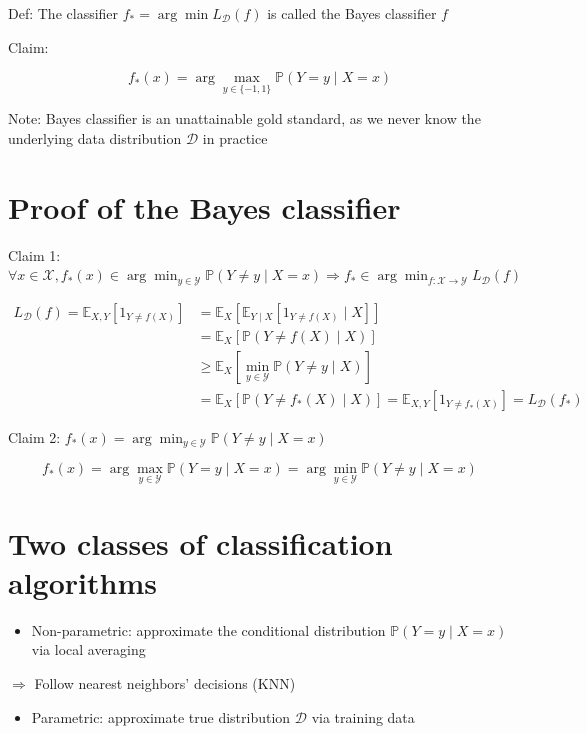\documentclass[10pt]{article}
\begin{document}
Def: The classifier $f_{*}=\arg \min L_{\mathscr{D}}(f)$ is called the Bayes classifier $f$

Claim:

$$
f_{*}(x)=\arg \max _{y \in\{-1,1\}} \mathbb{P}(Y=y \mid X=x)
$$

Note: Bayes classifier is an unattainable gold standard, as we never know the underlying data distribution $\mathscr{D}$ in practice

\section*{Proof of the Bayes classifier}
Claim 1: $\forall x \in \mathscr{X}, f_{*}(x) \in \arg \min _{y \in \mathscr{Y}} \mathbb{P}(Y \neq y \mid X=x) \Longrightarrow f_{*} \in \arg \min _{f: \mathscr{X} \rightarrow \mathscr{Y}} L_{\mathscr{D}}(f)$

$$
\begin{aligned}
L_{\mathscr{D}}(f)=\mathbb{E}_{X, Y}\left[1_{Y \neq f(X)}\right] & =\mathbb{E}_{X}\left[\mathbb{E}_{Y \mid X}\left[1_{Y \neq f(X)} \mid X\right]\right] \\
& =\mathbb{E}_{X}[\mathbb{P}(Y \neq f(X) \mid X)] \\
& \geq \mathbb{E}_{X}\left[\min _{y \in \mathscr{Y}} \mathbb{P}(Y \neq y \mid X)\right] \\
& =\mathbb{E}_{X}\left[\mathbb{P}\left(Y \neq f_{*}(X) \mid X\right)\right]=\mathbb{E}_{X, Y}\left[1_{Y \neq f_{*}(X)}\right]=L_{\mathscr{D}}\left(f_{*}\right)
\end{aligned}
$$

Claim 2: $f_{*}(x)=\arg \min _{y \in \mathscr{Y}} \mathbb{P}(Y \neq y \mid X=x)$

$$
f_{*}(x)=\arg \max _{y \in \mathscr{Y}} \mathbb{P}(Y=y \mid X=x)=\arg \min _{y \in \mathscr{Y}} \mathbb{P}(Y \neq y \mid X=x)
$$

\section*{Two classes of classification algorithms}
\begin{itemize}
  \item Non-parametric: approximate the conditional distribution $\mathbb{P}(Y=y \mid X=x)$ via local averaging
\end{itemize}

$\Rightarrow$ Follow nearest neighbors' decisions (KNN)

\begin{itemize}
  \item Parametric: approximate true distribution $\mathscr{D}$ via training data
\end{itemize}
\end{document}
